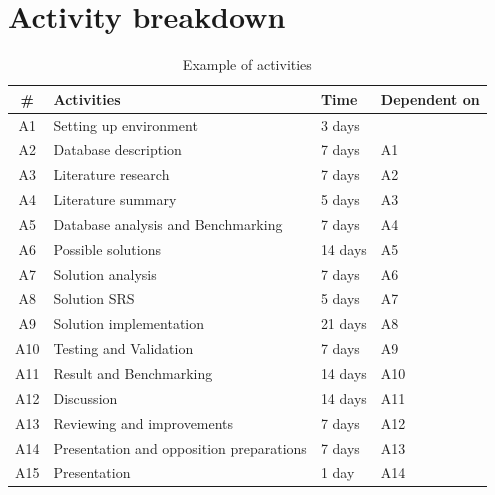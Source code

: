 \documentclass[12pt,a4paper]{article}
\begin{document}
\section*{Activity breakdown}
\begin{table}[H]
    \begin{tabular}{| c | l | l | l |}
    \hline
    \# & \textbf{Activities} & \textbf{Time} & \textbf{Dependent on}\\\hline
		A1 & Setting up environment & 3 days & \\\hline
  		A2 & Database description &  7 days & A1 \\\hline
  		A3 & Literature research & 7 days & A2 \\\hline
    A4 & Literature summary & 5 days & A3 \\\hline
    A5 & Database analysis and Benchmarking & 7 days & A4 \\\hline
    A6 & Possible solutions & 14 days & A5 \\\hline
    A7 & Solution analysis & 7 days & A6 \\\hline
    A8 & Solution SRS & 5 days & A7 \\\hline
    A9 & Solution implementation & 21 days & A8 \\\hline
    A10 & Testing and Validation & 7 days & A9 \\\hline
    A11 & Result and Benchmarking & 14 days & A10 \\\hline
    A12 & Discussion & 14 days & A11 \\\hline
    A13 & Reviewing and improvements & 7 days & A12 \\\hline
    A14 & Presentation and opposition preparations & 7 days & A13 \\\hline
    A15 & Presentation & 1 day & A14\\\hline
    \end{tabular}
    \caption{Example of activities}
\end{table}
\end{document}
